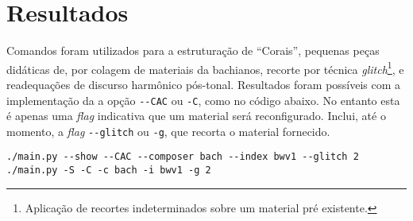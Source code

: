 \section{Resultados}\label{sec:resultados}

Comandos foram utilizados para a estruturação de ``Corais'', pequenas peças didáticas de, por colagem de materiais da bachianos, recorte por técnica \emph{glitch}\footnote{Aplicação de recortes indeterminados  sobre um material pré existente.}, e readequações de discurso harmônico pós-tonal. Resultados foram possíveis com a implementação da a opção \verb|--CAC| ou \verb|-C|, como no código abaixo. No entanto esta é apenas uma \emph{flag} indicativa que um material será reconfigurado. Inclui, até o momento, a \emph{flag} \verb|--glitch| ou \verb|-g|, que recorta o material fornecido.

\begin{listing}
\begin{verbatim}
./main.py --show --CAC --composer bach --index bwv1 --glitch 2
./main.py -S -C -c bach -i bwv1 -g 2
\end{verbatim}
\end{listing}

